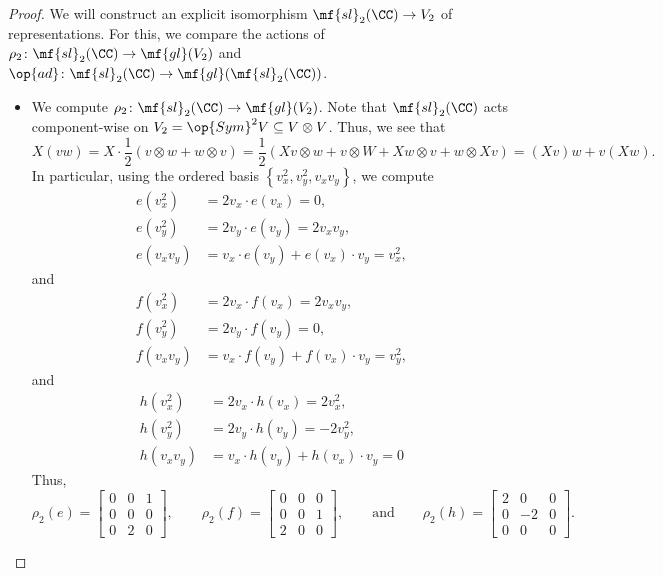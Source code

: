 \documentclass[../notes.tex]{subfiles}
\begin{document}
\begin{proof}
	We will construct an explicit isomorphism $\mf{sl}_2(\CC)\to V_2$ of representations. For this, we compare the actions of $\rho_2\colon\mf{sl}_2(\CC)\to\mf{gl}(V_2)$ and $\op{ad}\colon\mf{sl}_2(\CC)\to\mf{gl}(\mf{sl}_2(\CC))$.
	\begin{itemize}
		\item We compute $\rho_2\colon\mf{sl}_2(\CC)\to\mf{gl}(V_2)$. Note that $\mf{sl}_2(\CC)$ acts component-wise on $V_2=\op{Sym}^2V\subseteq V\otimes V$. Thus, we see that
		\[X(vw)=X\cdot\frac12\left(v\otimes w+w\otimes v\right)=\frac12(Xv\otimes w+v\otimes W+Xw\otimes v+w\otimes Xv)=(Xv)w+v(Xw).\]
		In particular, using the ordered basis $\left\{v_x^2,v_y^2,v_xv_y\right\}$, we compute
		\begin{align*}
			e\left(v_x^2\right) &= 2v_x\cdot e(v_x) = 0, \\
			e\left(v_y^2\right) &= 2v_y\cdot e(v_y) = 2v_xv_y, \\
			e(v_xv_y) &= v_x\cdot e(v_y)+e(v_x)\cdot v_y=v_x^2,
		\end{align*}
		and
		\begin{align*}
			f\left(v_x^2\right) &= 2v_x\cdot f(v_x) = 2v_xv_y, \\
			f\left(v_y^2\right) &= 2v_y\cdot f(v_y) = 0, \\
			f(v_xv_y) &= v_x\cdot f(v_y)+f(v_x)\cdot v_y = v_y^2,
		\end{align*}
		and
		\begin{align*}
			h\left(v_x^2\right) &= 2v_x\cdot h(v_x) = 2v_x^2, \\
			h\left(v_y^2\right) &= 2v_y\cdot h(v_y) = -2v_y^2, \\
			h(v_xv_y) &= v_x\cdot h(v_y)+h(v_x)\cdot v_y = 0
		\end{align*}
		Thus,
		\[\rho_2(e)=\begin{bmatrix}
			0 & 0 & 1 \\
			0 & 0 & 0 \\
			0 & 2 & 0
		\end{bmatrix},\qquad\rho_2(f)=\begin{bmatrix}
			0 & 0 & 0 \\
			0 & 0 & 1 \\
			2 & 0 & 0
		\end{bmatrix},\qquad\text{and}\qquad\rho_2(h)=\begin{bmatrix}
			2 & 0 & 0 \\
			0 & -2 & 0 \\
			0 & 0 & 0
		\end{bmatrix}.\]

\end{itemize}
\end{proof}
\end{document}
